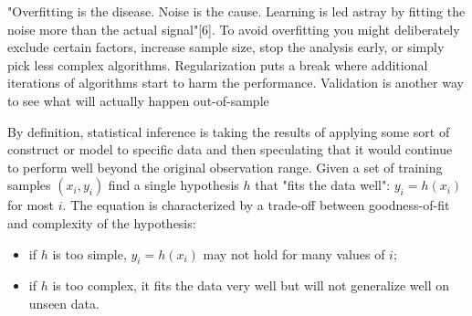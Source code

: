 
"Overﬁtting is the disease. Noise is the cause. Learning is led astray by ﬁtting the noise more than the actual signal"[6]. To avoid overﬁtting you might deliberately exclude certain factors, increase sample size, stop the analysis early, or simply pick less complex algorithms. Regularization puts a break where additional iterations of algorithms start to harm the performance. Validation is another way to see what will actually happen out-of-sample

By deﬁnition, statistical inference is taking the results of applying some sort of construct or model to speciﬁc data and then speculating that it would continue to perform well beyond the original observation range. Given a set of training samples \((x_i,y_i)\) ﬁnd a single hypothesis \(h\) that "fits the data well": \(y_i = h(x_i)\) for most \(i\). The equation is characterized by a trade-off between goodness-of-ﬁt and complexity of the hypothesis:

\begin{itemize}
\item if \(h\) is too simple, \(y_i = h(x_i)\) may not hold for many values of \(i\);
\item if \(h\) is too complex, it fits the data very well but will not generalize well on unseen data.
\end{itemize}


